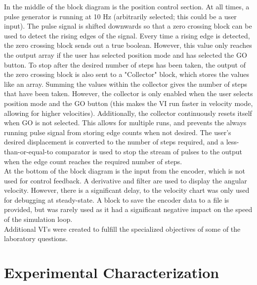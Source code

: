 \documentclass{article}
\theoremstyle{plain}
\theoremstyle{definition}
\theoremstyle{remark}
\begin{document}
In the middle of the block diagram is the position control section. At all times, a pulse generator is running at 10 Hz (arbitrarily selected; this could be a user input). The pulse signal is shifted downwards so that a zero crossing block can be used to detect the rising edges of the signal. Every time a rising edge is detected, the zero crossing block sends out a true boolean. However, this value only reaches the output array if the user has selected position mode and has selected the GO button. To stop after the desired number of steps has been taken, the output of the zero crossing block is also sent to a "Collector" block, which stores the values like an array. Summing the values within the collector gives the number of steps that have been taken. However, the collector is only enabled when the user selects position mode and the GO button (this makes the VI run faster in velocity mode, allowing for higher velocities). Additionally, the collector continuously resets itself when GO is not selected. This allows for multiple runs, and prevents the always running pulse signal from storing edge counts when not desired. The user's desired displacement is converted to the number of steps required, and a less-than-or-equal-to comparator is used to stop the stream of pulses to the output when the edge count reaches the required number of steps.\\

At the bottom of the block diagram is the input from the encoder, which is not used for control feedback. A derivative and filter are used to display the angular velocity. However, there is a significant delay, to the velocity chart was only used for debugging at steady-state. A block to save the encoder data to a file is provided, but was rarely used as it had a significant negative impact on the speed of the simulation loop.   \\

Additional VI's were created to fulfill the specialized objectives of some of the laboratory questions.\\
\clearpage

\section{Experimental Characterization}
\end{document}
